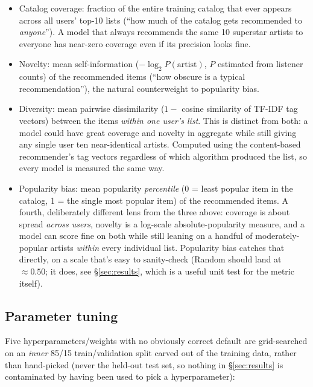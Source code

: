 \documentclass[11pt,a4paper]{article}
\newcommand{\secref}[1]{\S\ref{#1}}
\begin{document}
\begin{itemize}[leftmargin=*]
  \item Catalog coverage: fraction of the entire training catalog that ever appears across all users' top-10 lists (``how much of the catalog gets recommended to \emph{anyone}''). A model that always recommends the same 10 superstar artists to everyone has near-zero coverage even if its precision looks fine.
  \item Novelty: mean self-information ($-\log_2 P(\text{artist})$, $P$ estimated from listener counts) of the recommended items (``how obscure is a typical recommendation''), the natural counterweight to popularity bias.
  \item Diversity: mean pairwise dissimilarity ($1 - $ cosine similarity of TF-IDF tag vectors) between the items \emph{within one user's list}. This is distinct from both: a model could have great coverage and novelty in aggregate while still giving any single user ten near-identical artists. Computed using the content-based recommender's tag vectors regardless of which algorithm produced the list, so every model is measured the same way.
  \item Popularity bias: mean popularity \emph{percentile} (0 = least popular item in the catalog, 1 = the single most popular item) of the recommended items. A fourth, deliberately different lens from the three above: coverage is about spread \emph{across users}, novelty is a log-scale absolute-popularity measure, and a model can score fine on both while still leaning on a handful of moderately-popular artists \emph{within} every individual list. Popularity bias catches that directly, on a scale that's easy to sanity-check (Random should land at $\approx 0.50$; it does, see \secref{sec:results}, which is a useful unit test for the metric itself).
\end{itemize}

\subsection{Parameter tuning}

Five hyperparameters/weights with no obviously correct default are grid-searched on an \emph{inner} 85/15 train/validation split carved out of the training data, rather than hand-picked (never the held-out test set, so nothing in \secref{sec:results} is contaminated by having been used to pick a hyperparameter):
\end{document}
